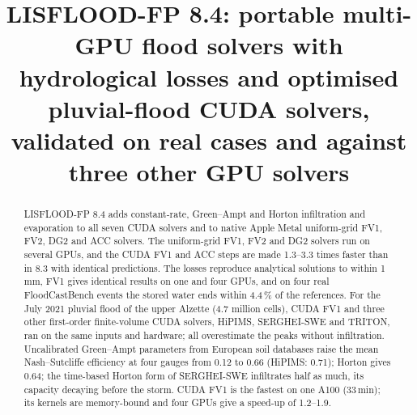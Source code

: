\documentclass[gmd, manuscript]{copernicus}
\begin{document}
\title{LISFLOOD-FP 8.4: portable multi-GPU flood solvers with hydrological losses and optimised pluvial-flood CUDA solvers, validated on real cases and against three other GPU solvers}




\received{}
\pubdiscuss{}
\revised{}
\accepted{}
\published{}


\maketitle

\begin{abstract}
LISFLOOD-FP 8.4 adds constant-rate, Green--Ampt and Horton infiltration and
evaporation to all seven CUDA solvers and to native Apple Metal uniform-grid
FV1, FV2, DG2 and ACC solvers. The uniform-grid FV1, FV2 and DG2 solvers run on several
GPUs, and the CUDA FV1 and ACC steps are made 1.3--3.3 times faster than in
8.3 with identical predictions. The losses reproduce analytical solutions to within
1\,mm, FV1 gives identical results on one and four GPUs, and on four real
FloodCastBench events the stored water ends within 4.4\,\% of the references.
For the July 2021 pluvial flood of the upper Alzette (4.7 million cells),
CUDA FV1 and three other first-order finite-volume CUDA solvers, HiPIMS,
SERGHEI-SWE and TRITON, ran on the same inputs and hardware; all overestimate
the peaks without infiltration. Uncalibrated Green--Ampt parameters from
European soil databases raise the mean Nash--Sutcliffe efficiency at four
gauges from 0.12 to 0.66 (HiPIMS: 0.71); Horton gives 0.64; the time-based
Horton form of SERGHEI-SWE infiltrates half as much, its capacity decaying
before the storm. CUDA FV1 is the fastest on one A100 (33\,min); its kernels
are memory-bound and four GPUs give a speed-up of 1.2--1.9.
\end{abstract}

\introduction
\end{document}
